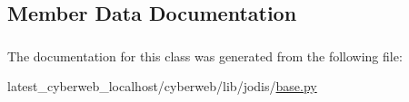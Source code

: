 \subsection{\-Member \-Data \-Documentation}
\hypertarget{classcyberweb_1_1lib_1_1jodis_1_1base_1_1_jodis_task_abec676c8bbce77bc0dfb890e06cd81ba}{
\subsubsection[{submitted}]{}}\label{classcyberweb_1_1lib_1_1jodis_1_1base_1_1_jodis_task_abec676c8bbce77bc0dfb890e06cd81ba}


\-The documentation for this class was generated from the following file\-:\begin{DoxyCompactItemize}
\item 
latest\-\_\-cyberweb\-\_\-localhost/cyberweb/lib/jodis/\hyperlink{jodis_2base_8py}{base.\-py}\end{DoxyCompactItemize}
